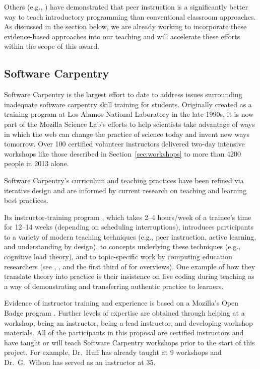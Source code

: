 \documentclass{proposalnsf}
\newlength{\up}
\begin{document}
Others (e.g., \cite{porter2013}) have demonstrated that peer
instruction is a significantly better way to teach introductory
programming than conventional classroom approaches.  As discussed in
the section below, we are already working to incorporate these
evidence-based approaches into our teaching and will accelerate these
efforts within the scope of this award.

\subsection{Software Carpentry}
\label{sec:SC}

Software Carpentry \cite{swcsite,wilson2012} is the largest effort to
date to address issues surrounding inadequate software carpentry skill
training for students. Originally created as a training program at Los
Alamos National Laboratory in the late 1990s, it is now part of the
Mozilla Science Lab's efforts to help scientists take advantage of
ways in which the web can change the practice of science today and
invent new ways tomorrow.  Over 100 certified volunteer instructors
delivered two-day intensive workshops like those described in Section~\ref{sec:workshops} to more than 4200 people in 2013
alone.

Software Carpentry's curriculum and teaching practices have been
refined via iterative design and are informed by current research on
teaching and learning best practices.  


Its instructor-training program \cite{trainingsite}, which takes 2--4 hours/week of a
trainee's time for 12--14 weeks (depending on scheduling interruptions), introduces participants to a variety of modern
teaching techniques (e.g., peer instruction, active learning, and
understanding by design), to concepts underlying these techniques
(e.g., cognitive load theory), and to topic-specific work by computing
education researchers (see \cite{guzdial2010}, \cite{hazzan2011}, and
the first third of \cite{sorva2012} for overviews).  One example of
how they translate theory into practice is their insistence on live
coding during teaching as a way of demonstrating and transferring
authentic practice to learners.

Evidence of instructor training and experience is based on a Mozilla's
Open Badge program \cite{badges2014}. Further levels of expertise are
obtained through helping at a workshop, being an instructor, being a 
lead instructor, and developing workshop materials. All of the 
participants in this proposal are certified instructors and have 
taught or will teach Software Carpentry workshops prior to the start
of this project. For example, Dr.\ Huff has already taught at 9 
workshops and Dr.\ G.\ Wilson has served as an instructor at 35. 
\end{document}
